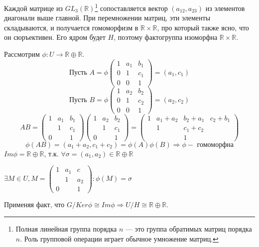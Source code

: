 Каждой матрице из $GL_3(\mathbb{R})$\footnote{Полная линейная группа порядка $n$ — это группа обратимых матриц порядка $n$. Роль групповой операции играет обычное умножение матриц.} сопоставляется вектор $(a_{12},a_{23})$ из элементов диагонали выше главной. При перемножении матриц, эти элементы складываются, и получается гомоморфизм в $\mathbb{R} \times \mathbb{R}$, про который также ясно, что он сюръективен. Его ядром будет $H$, поэтому фактогруппа изоморфна $\mathbb{R} \times \mathbb{R}$.

Рассмотрим $\phi: U \to \mathbb{R} \oplus \mathbb{R}$.
\[
\text{Пусть } A = \phi
\begin{pmatrix}
1 & a_1 & b_1 \\
0 & 1 & c_1 \\
0 & 0 & 1
\end{pmatrix}
= (a_1, c_1)
\]
\[
\text{Пусть } B = \phi
\begin{pmatrix}
1 & a_2 & b_2 \\
0 & 1 & c_2 \\
0 & 0 & 1
\end{pmatrix}
= (a_2, c_2)
\]
\[
AB =
\begin{pmatrix}
1 & a_1 & b_1 \\
  & 1 	& c_1 \\
0 &     & 1
\end{pmatrix}
\begin{pmatrix}
1 & a_2 & b_2 \\
  & 1   & c_1 \\
0 &     & 1
\end{pmatrix}
=
\begin{pmatrix}
1 & a_1 + a_2 & b_2 + a_1 & c_2 + b_1 \\
  & 1         & c_1 + c_2 &           \\
  &           & 1         &
\end{pmatrix}
\]
\[ \phi(AB) = (a_1 + a_2, c_1 + c_2) = \phi(A) \phi(B) \Rightarrow \phi - \text{ гомоморфна} \]
$Im \phi = \mathbb{R} \oplus \mathbb{R}$, т.к. $\forall \sigma = (a_1, a_2) \in \mathbb{R} \oplus \mathbb{R}$

\noindent$\exists M \in U, M = \left(\begin{smallmatrix} 1 & a_1 & c \\ & 1 & a_2 \\ 0 & & 1 \end{smallmatrix}\right): \phi(M) = \sigma$

Применяя факт, что $G / Ker \phi \cong Im \phi \Rightarrow U / H \cong \mathbb{R} \oplus \mathbb{R}$.


